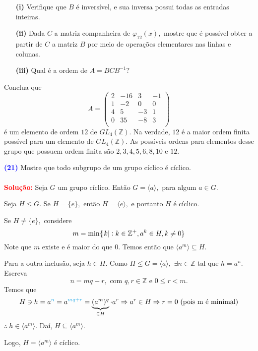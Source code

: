 \documentclass[12pt, a4paper]{article}
\newcommand{\negrito}[1]{\mbox{\boldmath{$#1$}}}
\begin{document}
\begin{tasks}[counter-format={(tsk[a])},label-width=3.6ex, label-format = {\bfseries}, column-sep = {0pt}]
\begin{itemize}
\item[\textbf{(i)}] Verifique que $B$ é inversível, e sua inversa possui todas as entradas inteiras.
\item[\textbf{(ii)}] Dada $C$ a matriz companheira de $\varphi_{12}(x),$ mostre que é possível obter a partir de $C$ a matriz $B$ por meio de operações elementares nas linhas e colunas.
\item[\textbf{(iii)}] Qual é a ordem de $A = BCB^{-1}?$
\end{itemize}
\task[\textcolor{Floresta}{$\negrito{(d)} $}] Conclua que 
\[
A =  \left(\begin{array}{cccc}
2 & -16 & 3 & -1\\
1 & -2 & 0 & 0\\
4 & 5 & -3 & 1\\
0 & 35 & -8 & 3\\
\end{array}\right)
\]
é um elemento de ordem $12$ de $GL_4(\mathbb{Z})$. Na verdade, $12$ é a maior ordem finita possível para um elemento de $GL_4(\mathbb{Z}).$ As possíveis ordens para elementos desse grupo que possuem ordem finita são $2,3,4,5,6,8,10$ e $12.$
\end{tasks}
\textcolor{blue}{\bf(21)}\label{28} Mostre que todo subgrupo de um grupo cíclico é cíclico.\\ \\
\textbf{\textcolor{red}{Solução:}} Seja $G$ um grupo cíclico. Então $G = \langle a \rangle,$ para algum $a \in G.$ 

Seja $H \le G.$ Se $H = \{ e \},$ então $H = \langle e \rangle,$ e portanto $H$ é cíclico.

Se $H \neq \{ e \},$ considere\[
m = \min \{ \abs{k} : k \in \mathbb{Z}^{+}, a^k \in H, k \neq 0 \}
\]
Note que $m$ existe e é maior do que $0.$ Temos então que $\langle a^m \rangle \subseteq H.$

 Para a outra inclusão, seja $h \in H.$ Como $H \le G = \langle a \rangle,$ $\exists n \in \mathbb{Z}$ tal que $h = a^n.$ Escreva
 \[
 n = mq+r, \mbox{ com }q,r \in \mathbb{Z} \mbox{ e } 0 \le r < m.
 \]
 Temos que
 \[
 H \ni h = a^{\textcolor{Cerulean}{n}} =   a^{\textcolor{Cerulean}{mq+r}} = \underbrace{(a^m)^q}_{\in H} \cdot a^r \Rightarrow a^r \in H \Rightarrow r = 0 \mbox{ (pois m é minimal)}
 \]
 $\therefore \ h \in \langle a^m \rangle.$ Daí, $H \subseteq \langle a^m \rangle.$
 
 Logo, $H = \langle a^m \rangle$ é cíclico.
 
\end{document}
